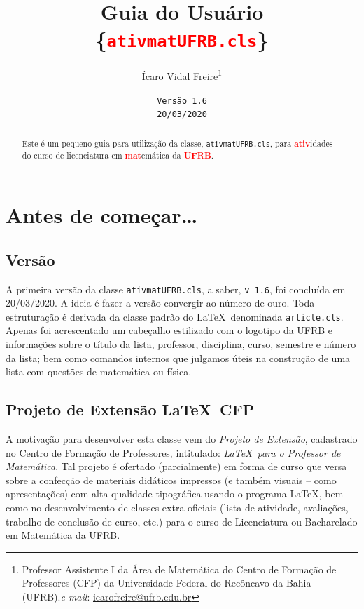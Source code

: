 \documentclass[a4paper]{article}
\title{\textbf{Guia do Usuário}\\ \Large\{\texttt{\textcolor{red}{\textbf{ativmatUFRB.cls}}}\}}
\author{Ícaro Vidal Freire\thanks{Professor Assistente I da Área de Matemática do Centro de Formação de Professores (CFP) da Universidade Federal do Recôncavo da Bahia (UFRB).\newline \emph{e-mail}: \href{mailto:icarofreire@ufrb.edu.br}{icarofreire@ufrb.edu.br}}}
\date{\normalsize{\texttt{Versão~1.6}}\\ \small{\texttt{20/03/2020}}}
\begin{document}
\maketitle
\begin{abstract}
Este é um pequeno guia para utilização da classe, \texttt{ativmatUFRB.cls}, para \textcolor{red}{\textbf{ativ}}idades do curso de licenciatura em \textcolor{red}{\textbf{mat}}emática da \textcolor{red}{\textbf{UFRB}}.
\end{abstract}

\tableofcontents
%

\section{Antes de começar\ldots}
	\subsection{Versão}
	A primeira versão da classe \texttt{ativmatUFRB.cls}, a saber, \texttt{v~1.6}, foi concluída em 20/03/2020. A ideia é fazer a versão convergir ao número de ouro. Toda estruturação é derivada da classe padrão do \LaTeX\ denominada \texttt{article.cls}. Apenas foi acrescentado um cabeçalho estilizado com o logotipo da UFRB e informações sobre o título da lista, professor, disciplina, curso, semestre e número da lista; bem como comandos internos que julgamos úteis na construção de uma lista com questões de matemática ou física.
	\subsection{Projeto de Extensão \LaTeX\ CFP}
	A motivação para desenvolver esta classe vem do \emph{Projeto de Extensão}, cadastrado no Centro de Formação de Professores, intitulado: \emph{\LaTeX\ para o Professor de Matemática}. Tal projeto é ofertado (parcialmente) em forma de curso que versa sobre a confecção de materiais didáticos impressos (e também visuais – como apresentações) com alta qualidade tipográfica usando o programa \LaTeX, bem como no desenvolvimento de classes extra-oficiais (lista de atividade, avaliações, trabalho de conclusão de curso, etc.) para o curso de Licenciatura ou Bacharelado em Matemática da UFRB.
	
\end{document}
